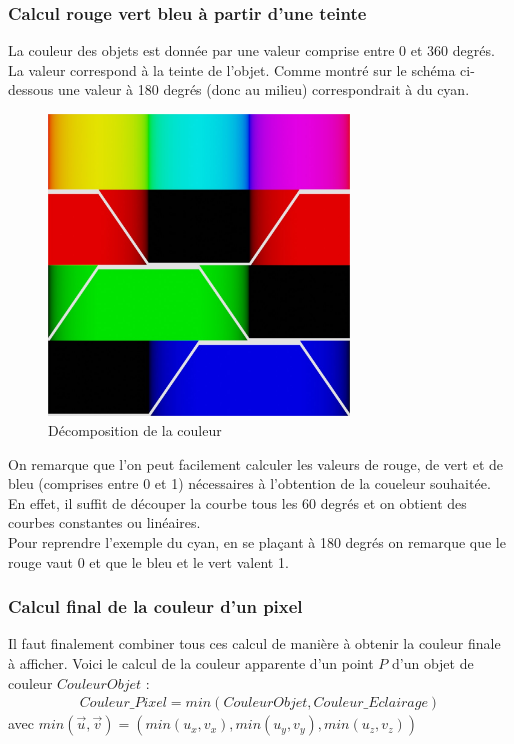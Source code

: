 \newpage
\subsubsection{Calcul rouge vert bleu à partir d'une teinte}

La couleur des objets est donnée par une valeur comprise entre 0 et 360 degrés. La valeur correspond à la teinte de l'objet. Comme montré sur le schéma ci-dessous une valeur à 180 degrés (donc au milieu) correspondrait à du cyan.

\begin{figure}[h]
    \centering
    \includegraphics[width=8cm]{images/huetorgb.jpg}
    \caption{Décomposition de la couleur }\label{fig:huetorb}
\end{figure}

On remarque que l'on peut facilement calculer les valeurs de rouge, de vert et de bleu (comprises entre 0 et 1) nécessaires à l'obtention de la coueleur souhaitée.\\
En effet, il suffit de découper la courbe tous les 60 degrés et on obtient des courbes constantes ou linéaires.\\
Pour reprendre l'exemple du cyan, en se plaçant à 180 degrés on remarque que le rouge vaut 0 et que le bleu et le vert valent 1.


\subsubsection{Calcul final de la couleur d'un pixel}
Il faut finalement combiner tous ces calcul de manière à obtenir la couleur finale à afficher. Voici le calcul de la couleur apparente d'un point $P$ d'un objet de couleur $CouleurObjet$ :
\begin{align*}
    Couleur\_Pixel=min(CouleurObjet,Couleur\_Eclairage)%
\end{align*}
avec $min(\Vec{u},\Vec{v})=(min(u_x,v_x),min(u_y,v_y),min(u_z,v_z))$